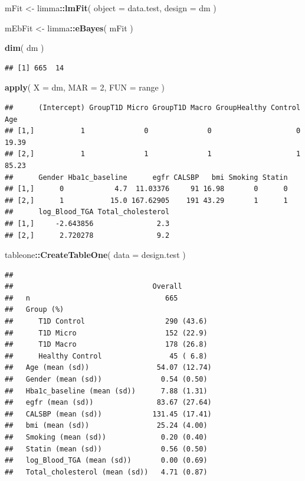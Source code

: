 \documentclass[]{article}
\newenvironment{Shaded}{\begin{snugshade}}{\end{snugshade}}
\newcommand{\DataTypeTok}[1]{\textcolor[rgb]{0.13,0.29,0.53}{#1}}
\newcommand{\DecValTok}[1]{\textcolor[rgb]{0.00,0.00,0.81}{#1}}
\newcommand{\KeywordTok}[1]{\textcolor[rgb]{0.13,0.29,0.53}{\textbf{#1}}}
\newcommand{\NormalTok}[1]{#1}
\newcommand{\OperatorTok}[1]{\textcolor[rgb]{0.81,0.36,0.00}{\textbf{#1}}}
\newcommand{\StringTok}[1]{\textcolor[rgb]{0.31,0.60,0.02}{#1}}
\begin{document}
\begin{Shaded}
\begin{Highlighting}[]
\NormalTok{mFit <-}\StringTok{ }
\StringTok{  }\NormalTok{limma}\OperatorTok{::}\KeywordTok{lmFit}\NormalTok{(}
    \DataTypeTok{object =}\NormalTok{ data.test,}
    \DataTypeTok{design =}\NormalTok{ dm}
\NormalTok{  )}

\NormalTok{mEbFit <-}\StringTok{ }\NormalTok{limma}\OperatorTok{::}\KeywordTok{eBayes}\NormalTok{( mFit )}

\KeywordTok{dim}\NormalTok{( dm )}
\end{Highlighting}
\end{Shaded}

\begin{verbatim}
## [1] 665  14
\end{verbatim}

\begin{Shaded}
\begin{Highlighting}[]
\KeywordTok{apply}\NormalTok{( }\DataTypeTok{X =}\NormalTok{ dm, }\DataTypeTok{MAR =} \DecValTok{2}\NormalTok{, }\DataTypeTok{FUN =}\NormalTok{ range )}
\end{Highlighting}
\end{Shaded}

\begin{verbatim}
##      (Intercept) GroupT1D Micro GroupT1D Macro GroupHealthy Control   Age
## [1,]           1              0              0                    0 19.39
## [2,]           1              1              1                    1 85.23
##      Gender Hba1c_baseline      egfr CALSBP   bmi Smoking Statin
## [1,]      0            4.7  11.03376     91 16.98       0      0
## [2,]      1           15.0 167.62905    191 43.29       1      1
##      log_Blood_TGA Total_cholesterol
## [1,]     -2.643856               2.3
## [2,]      2.720278               9.2
\end{verbatim}

\begin{Shaded}
\begin{Highlighting}[]
\NormalTok{tableone}\OperatorTok{::}\KeywordTok{CreateTableOne}\NormalTok{( }\DataTypeTok{data =}\NormalTok{ design.test )}
\end{Highlighting}
\end{Shaded}

\begin{verbatim}
##                                
##                                 Overall       
##   n                                665        
##   Group (%)                                   
##      T1D Control                   290 (43.6) 
##      T1D Micro                     152 (22.9) 
##      T1D Macro                     178 (26.8) 
##      Healthy Control                45 ( 6.8) 
##   Age (mean (sd))                54.07 (12.74)
##   Gender (mean (sd))              0.54 (0.50) 
##   Hba1c_baseline (mean (sd))      7.88 (1.31) 
##   egfr (mean (sd))               83.67 (27.64)
##   CALSBP (mean (sd))            131.45 (17.41)
##   bmi (mean (sd))                25.24 (4.00) 
##   Smoking (mean (sd))             0.20 (0.40) 
##   Statin (mean (sd))              0.56 (0.50) 
##   log_Blood_TGA (mean (sd))       0.00 (0.69) 
##   Total_cholesterol (mean (sd))   4.71 (0.87)
\end{verbatim}
\end{document}
